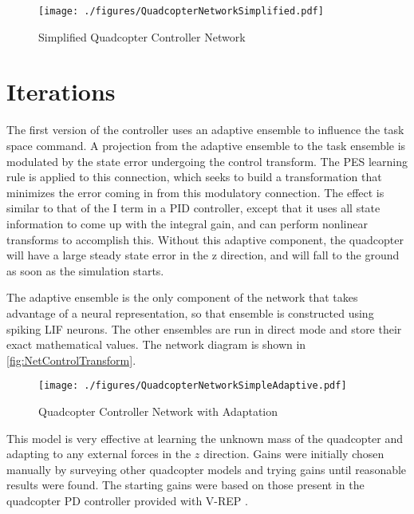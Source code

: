 \documentclass[letterpaper,12pt,titlepage,oneside,final]{book}
\begin{document}
\begin{figure}
\centering
\texttt{[image: ./figures/QuadcopterNetworkSimplified.pdf]} %
\caption{Simplified Quadcopter Controller Network}
\label{fig:NetSimplified}
\end{figure}

\section{Iterations}


The first version of the controller uses an adaptive ensemble to influence the task space command. 
A projection from the adaptive ensemble to the task ensemble is modulated by the state error undergoing the control transform. 
The PES learning rule is applied to this connection, which seeks to build a transformation that minimizes the error coming in from this modulatory connection. 
The effect is similar to that of the I term in a PID controller, except that it uses all state information to come up with the integral gain, and can perform nonlinear transforms to accomplish this. Without this adaptive component, the quadcopter will have a large steady state error in the z direction, and will fall to the ground as soon as the simulation starts.

The adaptive ensemble is the only component of the network that takes advantage of a neural representation, so that ensemble is constructed using spiking LIF neurons. The other ensembles are run in direct mode and store their exact mathematical values.
The network diagram is shown in \autoref{fig:NetControlTransform}.

\begin{figure}
\centering
\texttt{[image: ./figures/QuadcopterNetworkSimpleAdaptive.pdf]} %
\caption{Quadcopter Controller Network with Adaptation}
\label{fig:NetControlTransform}

\end{figure}

This model is very effective at learning the unknown mass of the quadcopter and adapting to any external forces in the $z$ direction. 
Gains were initially chosen manually by surveying other quadcopter models and trying gains until reasonable results were found. %
The starting gains were based on those present in the quadcopter PD controller provided with V-REP \cite{vrep}.
\end{document}
